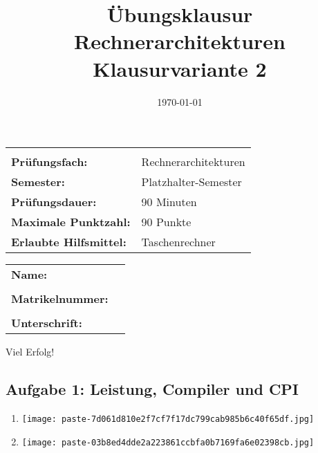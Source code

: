 \documentclass[12pt,a4paper]{article}
\title{Übungsklausur Rechnerarchitekturen \\ \large Klausurvariante 2}
\author{}
\date{\today}
\begin{document}
\begin{titlepage}
    \maketitle
    \vspace{0.5cm}
    \centering
    \begin{tabularx}{0.9\textwidth}{lX}
        \hline\hline \\
        \textbf{Prüfungsfach:} & Rechnerarchitekturen \\
        \textbf{Semester:} & Platzhalter-Semester \\
        \textbf{Prüfungsdauer:} & 90 Minuten \\
        \textbf{Maximale Punktzahl:} & 90 Punkte \\
        \textbf{Erlaubte Hilfsmittel:} & Taschenrechner \\
        \hline\hline
    \end{tabularx}
    \vspace{2.5cm}
    \begin{tabularx}{0.9\textwidth}{lX}
        \textbf{Name:} & \dotfill \\
        \\
        \textbf{Matrikelnummer:} & \dotfill \\
        \\
        \textbf{Unterschrift:} & \dotfill \\
    \end{tabularx}
    \vfill
    {\Large Viel Erfolg!}
\end{titlepage}
\clearpage
\subsection*{Aufgabe 1: Leistung, Compiler und CPI}

\begin{enumerate}[label=\alph*), topsep=5pt, itemsep=10pt]
\item \mbox{}\begin{center}\texttt{[image: paste-7d061d810e2f7cf7f17dc799cab985b6c40f65df.jpg]}
\end{center}
\item \mbox{}\begin{center}\texttt{[image: paste-03b8ed4dde2a223861ccbfa0b7169fa6e02398cb.jpg]}
\end{center}
\end{enumerate}
\clearpage
\end{document}
